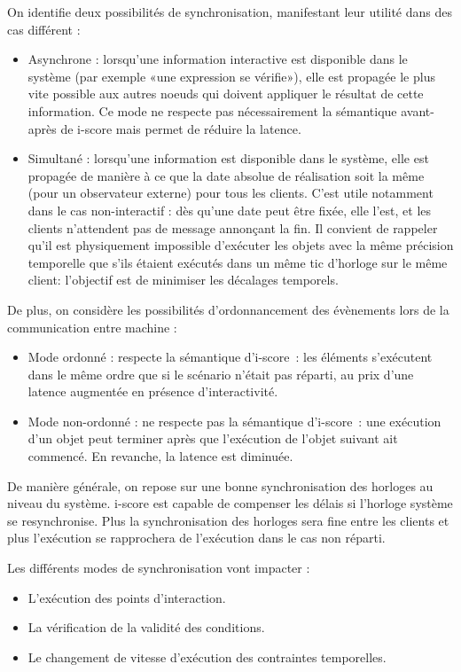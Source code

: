 \documentclass{article}
\newcommand\triggers{points d'interaction\xspace}
\begin{document}
On identifie deux possibilités de synchronisation, manifestant leur utilité dans des cas différent : 
\begin{itemize}
    \item Asynchrone : lorsqu'une information interactive est disponible dans le système (par exemple «une expression se vérifie»), elle est propagée le plus vite possible aux autres noeuds qui doivent appliquer le résultat de cette information. Ce mode ne respecte pas nécessairement la sémantique avant-après de i-score mais permet de réduire la latence.
    \item Simultané : lorsqu'une information est disponible dans le système, elle est propagée de manière à ce que la date absolue de réalisation soit la même (pour un observateur externe) pour tous les clients. 
    C'est utile notamment dans le cas non-interactif : dès qu'une date peut être fixée, elle l'est, et les clients n'attendent pas de message annonçant la fin. 
    Il convient de rappeler qu'il est physiquement impossible d'exécuter les objets avec la même précision temporelle que s'ils étaient exécutés dans un même tic d'horloge sur le même client: l'objectif est de minimiser les décalages temporels.
\end{itemize}

De plus, on considère les possibilités d'ordonnancement des évènements lors de la communication entre machine :

\begin{itemize}
    \item Mode ordonné : respecte la sémantique d'i-score~: les éléments s'exécutent dans le même ordre que si le scénario n'était pas réparti, au prix d'une latence augmentée en présence d'interactivité.
    \item Mode non-ordonné : ne respecte pas la sémantique d'i-score~: une exécution d'un objet peut terminer après que l'exécution de l'objet suivant ait commencé. En revanche, la latence est diminuée.    
\end{itemize}

De manière générale, on repose sur une bonne synchronisation des horloges au niveau du système.
i-score est capable de compenser les délais si l'horloge système se resynchronise.
Plus la synchronisation des horloges sera fine entre les clients et plus l'exécution se rapprochera de l'exécution dans le cas non réparti.

Les différents modes de synchronisation vont impacter : 
\begin{itemize}
    \item L'exécution des \triggers.
    \item La vérification de la validité des conditions.
    \item Le changement de vitesse d'exécution des contraintes temporelles.
\end{itemize}
\end{document}
